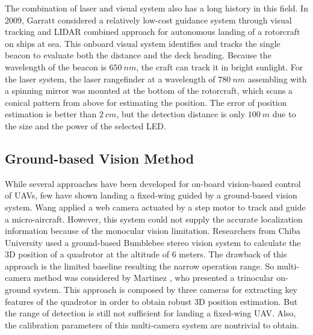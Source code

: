 
The combination of laser and visual system also has a long history in this field. In 2009, Garratt \cite{garrattvisual2009} considered a relatively low-cost guidance system through visual tracking and LIDAR combined approach for autonomous landing of a rotorcraft on ships at sea. This onboard visual system identifies and tracks the single beacon to evaluate both the distance and the deck heading. Because the wavelength of the beacon is $650\ nm$, the craft can track it in bright sunlight. For the laser system, the laser rangefinder at a wavelength of $780\ nm$ assembling with a spinning mirror was mounted at the bottom of the rotorcraft, which scans a conical pattern from above for estimating the position. The error of position estimation is better than $2\ cm$, but the detection distance is only $100\ m$ due to the size and the power of the selected LED. 

\subsection{Ground-based Vision Method}
While several approaches have been developed for on-board vision-based control of UAVs, few have shown landing a fixed-wing guided by a ground-based vision system. Wang \cite{Wang2006} applied a web camera actuated by a step motor to track and guide a micro-aircraft. However, this system could not supply the accurate localization information because of the monocular vision limitation. Researchers from Chiba University\cite{pebrianti2010autonomous} used a ground-based Bumblebee stereo vision system to calculate the 3D position of a quadrotor at the altitude of 6 meters. The drawback of this approach is the limited baseline resulting the narrow operation range. So multi-camera method was considered by Martinez \cite{Martinez2009a}, who presented a trinocular on-ground system. This approach is composed by three cameras for extracting key features of the quadrotor in order to obtain robust 3D position estimation. But the range of detection is still not sufficient for landing a fixed-wing UAV. Also, the calibration parameters of this multi-camera system are nontrivial to obtain.

